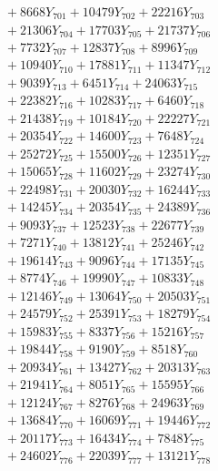 \documentclass[a4paper,10pt]{article}
\begin{document}
{\begin{align}
&\;  + 8668 Y_{701} + 10479 Y_{702} + 22216 Y_{703} \\[0.3ex]
&\;  + 21306 Y_{704} + 17703 Y_{705} + 21737 Y_{706} \\[0.3ex]
&\;  + 7732 Y_{707} + 12837 Y_{708} + 8996 Y_{709} \\[0.3ex]
&\;  + 10940 Y_{710} + 17881 Y_{711} + 11347 Y_{712} \\[0.3ex]
&\;  + 9039 Y_{713} + 6451 Y_{714} + 24063 Y_{715} \\[0.3ex]
&\;  + 22382 Y_{716} + 10283 Y_{717} + 6460 Y_{718} \\[0.5ex]\allowbreak
&\;  + 21438 Y_{719} + 10184 Y_{720} + 22227 Y_{721} \\[0.3ex]
&\;  + 20354 Y_{722} + 14600 Y_{723} + 7648 Y_{724} \\[0.3ex]
&\;  + 25272 Y_{725} + 15500 Y_{726} + 12351 Y_{727} \\[0.3ex]
&\;  + 15065 Y_{728} + 11602 Y_{729} + 23274 Y_{730} \\[0.3ex]
&\;  + 22498 Y_{731} + 20030 Y_{732} + 16244 Y_{733} \\[0.3ex]
&\;  + 14245 Y_{734} + 20354 Y_{735} + 24389 Y_{736} \\[0.3ex]
&\;  + 9093 Y_{737} + 12523 Y_{738} + 22677 Y_{739} \\[0.3ex]
&\;  + 7271 Y_{740} + 13812 Y_{741} + 25246 Y_{742} \\[0.3ex]
&\;  + 19614 Y_{743} + 9096 Y_{744} + 17135 Y_{745} \\[0.3ex]
&\;  + 8774 Y_{746} + 19990 Y_{747} + 10833 Y_{748} \\[0.5ex]\allowbreak
&\;  + 12146 Y_{749} + 13064 Y_{750} + 20503 Y_{751} \\[0.3ex]
&\;  + 24579 Y_{752} + 25391 Y_{753} + 18279 Y_{754} \\[0.3ex]
&\;  + 15983 Y_{755} + 8337 Y_{756} + 15216 Y_{757} \\[0.3ex]
&\;  + 19844 Y_{758} + 9190 Y_{759} + 8518 Y_{760} \\[0.3ex]
&\;  + 20934 Y_{761} + 13427 Y_{762} + 20313 Y_{763} \\[0.3ex]
&\;  + 21941 Y_{764} + 8051 Y_{765} + 15595 Y_{766} \\[0.3ex]
&\;  + 12124 Y_{767} + 8276 Y_{768} + 24963 Y_{769} \\[0.3ex]
&\;  + 13684 Y_{770} + 16069 Y_{771} + 19446 Y_{772} \\[0.3ex]
&\;  + 20117 Y_{773} + 16434 Y_{774} + 7848 Y_{775} \\[0.3ex]
&\;  + 24602 Y_{776} + 22039 Y_{777} + 13121 Y_{778} \\[0.5ex]\allowbreak

\end{align}}
\end{document}

